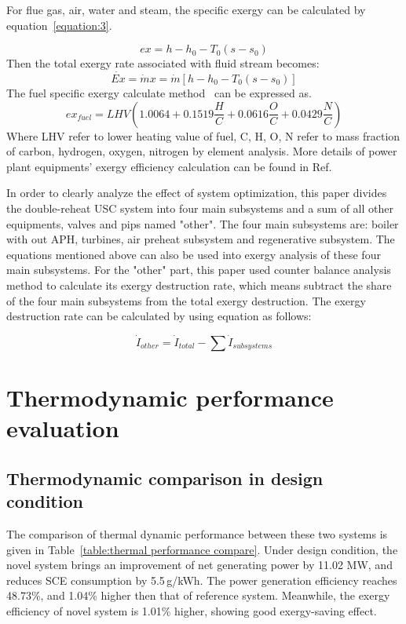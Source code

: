\documentclass[preprint,12pt]{elsarticle}
\begin{document}
For flue gas, air, water and steam, the specific exergy can be calculated by equation~\ref{equation:3}.

\begin{equation}{}
\label{equation:3}
ex=h-h_{0}-T_{0}\left(s-s_{0}\right)
\end{equation}
Then the total exergy rate associated with ﬂuid stream becomes:
\begin{equation}
\dot{Ex}=\dot{m}x=\dot{m}\left[h-h_{0}-T_{0}\left(s-s_{0}\right)\right]{}
\end{equation}
The fuel specific exergy calculate method~\cite{Yan2016The} can be expressed as.
\begin{equation}
ex_{fuel}=LHV\left(1.0064+0.1519\frac{H}{C}+0.0616\frac{O}{C}+0.0429\frac{N}{C}\right)
\end{equation}
Where LHV refer to lower heating value of fuel, C, H, O, N refer to mass fraction of carbon, hydrogen, oxygen, nitrogen by element analysis.
More details of power plant equipments' exergy  efficiency calculation can be found in Ref.~\cite{G2016Exergy}

In order to clearly analyze the effect of system optimization, this paper divides the double-reheat USC system into four main subsystems and a sum of all other equipments, valves and pips named "other".
The four main subsystems are: boiler with out APH, turbines, air preheat subsystem and regenerative subsystem.
The equations mentioned above can also be used into exergy analysis of these four main subsystems.
For the "other" part, this paper used counter balance analysis method to calculate its exergy destruction rate, which means subtract the share of the four main subsystems from the total exergy destruction.
The exergy destruction rate can be calculated by using equation as follows:

\begin{equation}
\dot{I}_{other}=\dot{I}{}_{total}-\sum\dot{I}{}_{subsystems}
\end{equation}


\section{Thermodynamic performance evaluation} %
\label{sub:Thermodynamic_evaluation}
\subsection{Thermodynamic comparison in design condition}
\label{ssub:desing_compare}
The comparison of thermal dynamic performance between these two systems is given in Table~\ref{table:thermal performance compare}. 
Under design condition, the novel system brings an improvement of net generating power by 11.02 MW, and reduces SCE consumption by 5.5\,g/kWh.
The power generation efficiency reaches 48.73\%, and 1.04\% higher then that of reference system.
Meanwhile, the exergy efficiency of novel system is 1.01\% higher, showing good exergy-saving effect. 
\end{document}
